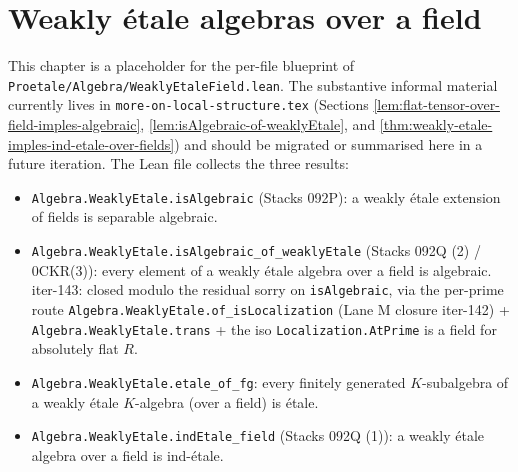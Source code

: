 \chapter{Weakly étale algebras over a field}
\label{ch:proetale-algebra-weaklyEtaleField}

This chapter is a placeholder for the per-file blueprint of
\texttt{Proetale/Algebra/WeaklyEtaleField.lean}. The substantive informal
material currently lives in \texttt{more-on-local-structure.tex}
(Sections \ref{lem:flat-tensor-over-field-imples-algebraic},
\ref{lem:isAlgebraic-of-weaklyEtale}, and
\ref{thm:weakly-etale-imples-ind-etale-over-fields}) and should be migrated
or summarised here in a future iteration. The Lean file collects the three
results:
\begin{itemize}
  \item \texttt{Algebra.WeaklyEtale.isAlgebraic} (Stacks 092P): a weakly
        étale extension of fields is separable algebraic.
  \item \texttt{Algebra.WeaklyEtale.isAlgebraic\_of\_weaklyEtale}
        (Stacks 092Q (2) / 0CKR(3)): every element of a weakly étale
        algebra over a field is algebraic. iter-143: closed modulo the
        residual sorry on \texttt{isAlgebraic}, via the per-prime route
        \texttt{Algebra.WeaklyEtale.of\_isLocalization} (Lane M closure
        iter-142) + \texttt{Algebra.WeaklyEtale.trans} + the iso
        \texttt{Localization.AtPrime} is a field for absolutely flat $R$.
  \item \texttt{Algebra.WeaklyEtale.etale\_of\_fg}: every finitely generated
        $K$-subalgebra of a weakly étale $K$-algebra (over a field) is étale.
  \item \texttt{Algebra.WeaklyEtale.indEtale\_field} (Stacks 092Q (1)):
        a weakly étale algebra over a field is ind-étale.
\end{itemize}

